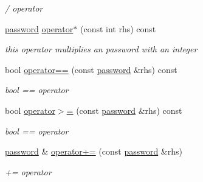 \begin{DoxyCompactItemize}
\begin{DoxyCompactList}\small\item\em / operator \end{DoxyCompactList}\item 
\hyperlink{classpassword}{password} \hyperlink{classpassword_a775500307f55707d950c6605de07c400}{operator$\ast$} (const int rhs) const 
\begin{DoxyCompactList}\small\item\em this operator multiplies an password with an integer \end{DoxyCompactList}\item 
bool \hyperlink{classpassword_a528a04105bb089391277c217d8272462}{operator==} (const \hyperlink{classpassword}{password} \&rhs) const 
\begin{DoxyCompactList}\small\item\em bool == operator \end{DoxyCompactList}\item 
bool \hyperlink{classpassword_aa15f528d4cdd5da15d5ea29b9cbe586f}{operator$>$=} (const \hyperlink{classpassword}{password} \&rhs) const 
\begin{DoxyCompactList}\small\item\em bool == operator \end{DoxyCompactList}\item 
\hyperlink{classpassword}{password} \& \hyperlink{classpassword_a5c4a32e2761f6d35ddd7d633955e6b0e}{operator+=} (const \hyperlink{classpassword}{password} \&rhs)
\begin{DoxyCompactList}\small\item\em += operator \end{DoxyCompactList}\end{DoxyCompactItemize}
